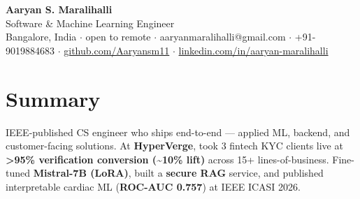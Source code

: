\documentclass[10pt,a4paper]{article}
\begin{document}
\vspace*{-1cm}
\begin{center}
{\LARGE\bfseries Aaryan S. Maralihalli}\\[0.5em]
{\large Software \& Machine Learning Engineer}\\[0.3em]
Bangalore, India $\cdot$ open to remote $\cdot$ aaryanmaralihalli@gmail.com $\cdot$ +91-9019884683 $\cdot$ \href{https://github.com/Aaryansm11}{github.com/Aaryansm11} $\cdot$ \href{https://linkedin.com/in/aaryan-maralihalli}{linkedin.com/in/aaryan-maralihalli}
\end{center}\vspace{0.4ex}
\section*{Summary}
IEEE-published CS engineer who ships end-to-end --- applied ML, backend, and customer-facing solutions. At \textbf{HyperVerge}, took 3 fintech KYC clients live at \textbf{\textgreater{}95\% verification conversion (\textasciitilde{}10\% lift)} across 15+ lines-of-business. Fine-tuned \textbf{Mistral-7B (LoRA)}, built a \textbf{secure RAG} service, and published interpretable cardiac ML (\textbf{ROC-AUC 0.757}) at IEEE ICASI 2026.\par\vspace{2pt}
\end{document}
